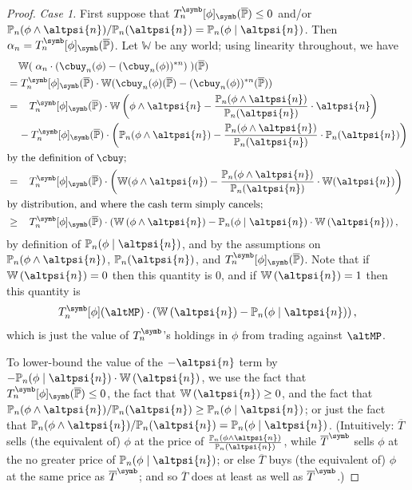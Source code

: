 \documentclass[authordate,onecolumn,noenvironments]{miri-tech-article}
\numberwithin{equation}{subsection}
\newcommand{\seq}[1]{{\overline{#1}}}
\newcommand{\nn}{n}
\newcommand{\trade}{T}%
\newcommand{\Trader}{\seq{\trade}} %
\newcommand{\BelState}{\mathbb{P}}
\newcommand{\pt}{\BelState}
\newcommand{\MP}{\seq{\pt}}
\newcommand{\World}{\mathbb{W}}
\begin{document}
\begin{proof}
\textit{Case 1.}
First suppose that $\trade^\symb_n[\phi]_{\symb}(\MP)\leq 0$ and/or $\pt_n(\phi \wedge \altpsi{n})/  \pt_n(\altpsi{n})  =  \pt_n (\phi \mid \altpsi{n})$.
Then $\alpha_n = \trade^\symb_n[\phi]_{\symb}(\MP)$. Let $\World$ be any world; using linearity throughout, we have
%
\begin{align*}
 &\;\;\;\; \World(\; \alpha_n \cdot (\cbuy_n(\phi) - (\cbuy_\nn(\phi))^{* n} )\; )(\MP) \\
  &=
 \trade^\symb_n[\phi]_{\symb}(\MP) \cdot \World(  \cbuy_n(\phi) (\MP) - (\cbuy_\nn(\phi))^{* n} (\MP) ) \\
 &=\;\;\; \trade^\symb_n[\phi]_{\symb}(\MP) \cdot \World\left(  \phi \wedge \altpsi{n} - 
 \frac{\pt_n (\phi \wedge \altpsi{n})}{\pt_n(\altpsi{n}) } 
 \cdot \altpsi{n}
 \right) \\
& \;\;\;\; -  \trade^\symb_n[\phi]_{\symb}(\MP) \cdot \left( 
\pt_n(\phi \wedge \altpsi{n})- 
\frac{\pt_n(\phi \wedge \altpsi{n})}{ \pt_n(\altpsi{n}) } 
\cdot 
\pt_n(\altpsi{n}) \right) \\
\intertext{by the definition of $\cbuy$;}
&=\;\;\; \trade^\symb_n[\phi]_{\symb}(\MP) \cdot \left(\World ( \phi \wedge \altpsi{n}) - 
 \frac{\pt_n (\phi \wedge \altpsi{n})}{\pt_n(\altpsi{n}) } 
 \cdot \World(\altpsi{n})
 \right)\\
\intertext{by distribution, and where the cash term simply cancels;}
 &\geq \;\;\; \trade^\symb_n[\phi]_{\symb}(\MP) \cdot \left( \World\left(  \phi \wedge \altpsi{n}\right) -
 \pt_n (\phi \mid \altpsi{n})  \cdot \World \left(  \altpsi{n}
 \right)
\right),  
\end{align*}
by definition of   $\pt_n (\phi \mid \altpsi{n})$, and by the assumptions on $\pt_n (\phi \wedge \altpsi{n})$, $\pt_n(\altpsi{n})$, and $\trade^\symb_n[\phi]_{\symb}(\MP)$. Note that if $\World \left(  \altpsi{n}
 \right)=0$ then this quantity is 0, and if $\World \left(  \altpsi{n}
 \right)=1$ then this quantity is 
 \[ \trade^\symb_n[\phi](\altMP) \cdot \left( \World\left( \altpsi{n}\right) -
 \pt_n (\phi \mid \altpsi{n})
\right),  
\]
 which is just the value of $\trade^\symb_n$'s holdings in $\phi$ from trading against $\altMP$.


To lower-bound the value of the $- \altpsi{n}$ term by $-
 \pt_n (\phi \mid \altpsi{n})  \cdot \World \left(  \altpsi{n}\right)$, we use the fact that $\trade^\symb_n[\phi]_{\symb}(\MP)\leq 0$, the fact that $\World \left(  \altpsi{n}
 \right) \geq 0$, and the fact that  $ \pt_n(\phi \wedge \altpsi{n})/  \pt_n(\altpsi{n})  \geq 
 \pt_n (\phi \mid \altpsi{n})  $; or just the fact that $\pt_n(\phi \wedge \altpsi{n})/  \pt_n(\altpsi{n})  =  \pt_n (\phi \mid \altpsi{n})$. (Intuitively: $\Trader$ sells (the equivalent of) $\phi$ at the price of $\frac{\pt_n(\phi \wedge \altpsi{n})}{ \pt_n(\altpsi{n}) }$, while $\Trader^{\symb}$ sells $\phi$  at the no greater price of $\pt_n (\phi \mid \altpsi{n})$; or else $\Trader$ buys (the equivalent of) $\phi$ at the same price as $\Trader^{\symb}$; and so $\Trader$ does at least as well as $\Trader^{\symb}$.)





\end{proof}
\end{document}
